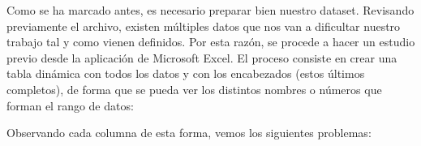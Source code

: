

Como se ha marcado antes, es necesario preparar bien nuestro dataset. Revisando previamente el archivo, existen múltiples datos que nos van a dificultar nuestro trabajo tal y como vienen definidos. Por esta razón, se procede a hacer un estudio previo desde la aplicación de Microsoft Excel. El proceso consiste en crear una tabla dinámica con todos los datos y con los encabezados (estos últimos completos), de forma que se pueda ver los distintos nombres o números que forman el rango de datos:
 
	 Observando cada columna de esta forma, vemos los siguientes problemas:

